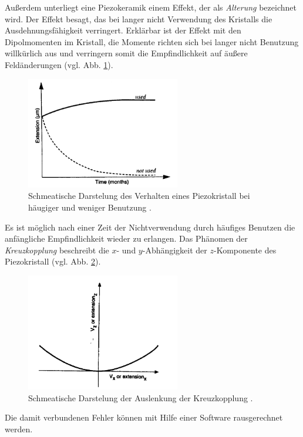 Außerdem unterliegt eine Piezokeramik einem Effekt, der als \emph{Alterung} bezeichnet wird. Der Effekt besagt,
das bei langer nicht Verwendung des Kristalls die Ausdehnungsfähigkeit verringert. Erklärbar ist der Effekt mit den
Dipolmomenten im Kristall, die Momente richten sich bei langer nicht Benutzung willkürlich aus und verringern
somit die Empfindlichkeit auf äußere Feldänderungen (vgl. Abb. \ref{fig: ageing}).
\begin{figure}[!h]
  \centering
  \includegraphics[width=0.6\textwidth]{./pics/ageing.png}
  \caption{Schmeatische Darstelung des Verhalten eines Piezokristall bei häugiger und weniger Benutzung \cite{rtm}.}
  \label{fig: ageing}
\end{figure}
Es ist möglich nach einer Zeit der Nichtverwendung
durch häufiges Benutzen die anfängliche Empfindlichkeit wieder zu erlangen.
Das Phänomen der \emph{Kreuzkopplung} beschreibt die $x$- und $y$-Abhängigkeit der $z$-Komponente des Piezokristall (vgl. Abb. \ref{fig: cross_copeling}).
\begin{figure}[!h]
  \centering
  \includegraphics[width=0.6\textwidth]{./pics/cross_copling.png}
  \caption{Schmeatische Darstelung der Auslenkung der Kreuzkopplung \cite{rtm}.}
  \label{fig: cross_copeling}
\end{figure}
Die damit verbundenen Fehler können mit Hilfe einer Software rausgerechnet werden.

